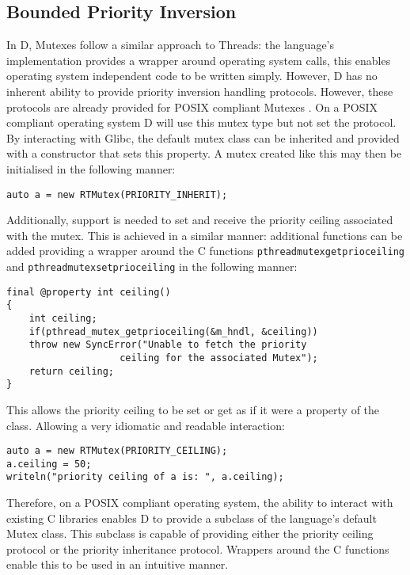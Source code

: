 \subsection{Bounded Priority Inversion}
In D, Mutexes follow a similar approach to Threads: the language's
implementation provides a wrapper around operating system calls, this 
enables operating system independent code to be written simply. However, D has no 
inherent ability to provide priority inversion handling protocols. 
However, these protocols are already provided for POSIX compliant Mutexes 
\cite{mutex-setprotocol}. On a POSIX 
compliant operating system D will use this mutex type but not set the protocol. 
By interacting with Glibc, the default mutex class can be inherited
and provided with a constructor that sets this property.
A mutex created like this may then be initialised in the following manner: 
\begin{lstlisting}
auto a = new RTMutex(PRIORITY_INHERIT);
\end{lstlisting}
Additionally, support is needed to set and receive the priority ceiling 
associated with the mutex. This is achieved in a similar manner: additional 
functions can be added providing a wrapper around the C functions 
\texttt{pthread\textunderscore{}mutex\textunderscore{}getprioceiling} and 
\texttt{pthread\textunderscore{}mutex\textunderscore{}setprioceiling}
in the following manner:
\begin{lstlisting}
final @property int ceiling()
{
    int ceiling; 
    if(pthread_mutex_getprioceiling(&m_hndl, &ceiling))
    throw new SyncError("Unable to fetch the priority 
                    ceiling for the associated Mutex"); 
    return ceiling; 
}
\end{lstlisting}
This allows the priority ceiling to be set or get as if it were a property of 
the class. Allowing a very idiomatic and readable interaction: 
\begin{lstlisting}
auto a = new RTMutex(PRIORITY_CEILING); 
a.ceiling = 50; 
writeln("priority ceiling of a is: ", a.ceiling); 
\end{lstlisting}
Therefore, on a POSIX compliant operating system, the ability to interact with 
existing C libraries enables D to provide a subclass of the language's default 
Mutex class. This subclass is capable of providing either the priority ceiling 
protocol or the priority inheritance protocol. Wrappers around the C functions 
enable this to be used in an intuitive manner. 

